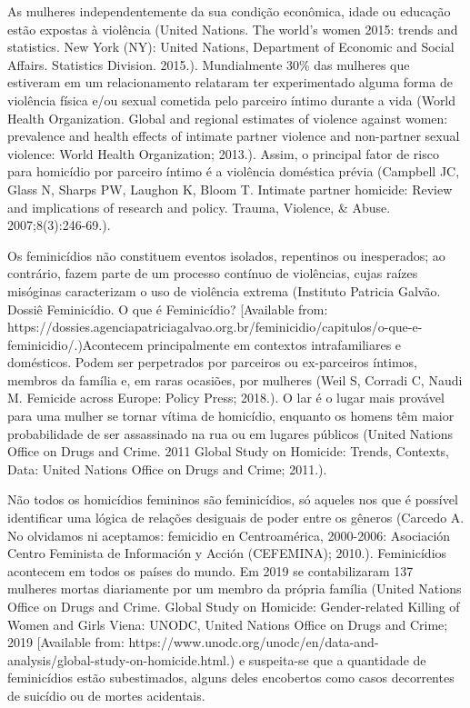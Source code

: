 As mulheres independentemente da sua condição econômica, idade ou educação estão expostas à violência (United  Nations. The world’s women 2015: trends and statistics. New York (NY): United Nations, Department of Economic and Social Affairs. Statistics Division. 2015.). Mundialmente 30\% das mulheres que estiveram em um relacionamento relataram ter experimentado alguma forma de violência física e/ou sexual cometida pelo parceiro íntimo durante a vida (World Health Organization. Global and regional estimates of violence against women: prevalence and health effects of intimate partner violence and non-partner sexual violence: World Health Organization; 2013.). Assim, o principal fator de risco para homicídio por parceiro íntimo é a violência doméstica prévia (Campbell JC, Glass N, Sharps PW, Laughon K, Bloom T. Intimate partner homicide: Review and implications of research and policy. Trauma, Violence, & Abuse. 2007;8(3):246-69.).

Os feminicídios não constituem eventos isolados, repentinos ou inesperados; ao contrário, fazem parte de um processo contínuo de violências, cujas raízes misóginas caracterizam o uso de violência extrema (Instituto Patricia Galvão. Dossiê Feminicídio. O que é Feminicídio?  [Available from: https://dossies.agenciapatriciagalvao.org.br/feminicidio/capitulos/o-que-e-feminicidio/.)Acontecem principalmente em contextos intrafamiliares e domésticos. Podem ser perpetrados por parceiros ou ex-parceiros íntimos, membros da família e, em raras ocasiões, por mulheres (Weil S, Corradi C, Naudi M. Femicide across Europe: Policy Press; 2018.). O lar é o lugar mais provável para uma mulher se tornar vítima de homicídio, enquanto os homens têm maior probabilidade de ser assassinado na rua ou em lugares públicos (United Nations Office on Drugs and Crime. 2011 Global Study on Homicide: Trends, Contexts, Data: United Nations Office on Drugs and Crime; 2011.). 

Não todos os homicídios femininos são feminicídios, só aqueles nos que é possível identificar uma lógica de relações desiguais de poder entre os gêneros (Carcedo A. No olvidamos ni aceptamos: femicidio en Centroamérica, 2000-2006: Asociación Centro Feminista de Información y Acción (CEFEMINA); 2010.). Feminicídios acontecem em todos os países do mundo. Em 2019 se contabilizaram 137 mulheres mortas diariamente por um membro da própria família (United Nations Office on Drugs and Crime. Global Study on Homicide: Gender-related Killing of Women and Girls Viena: UNODC, United Nations Office on Drugs and Crime; 2019 [Available from: https://www.unodc.org/unodc/en/data-and-analysis/global-study-on-homicide.html.) e suspeita-se que a quantidade de feminicídios estão subestimados, alguns deles encobertos como casos decorrentes de suicídio ou de mortes acidentais. 

